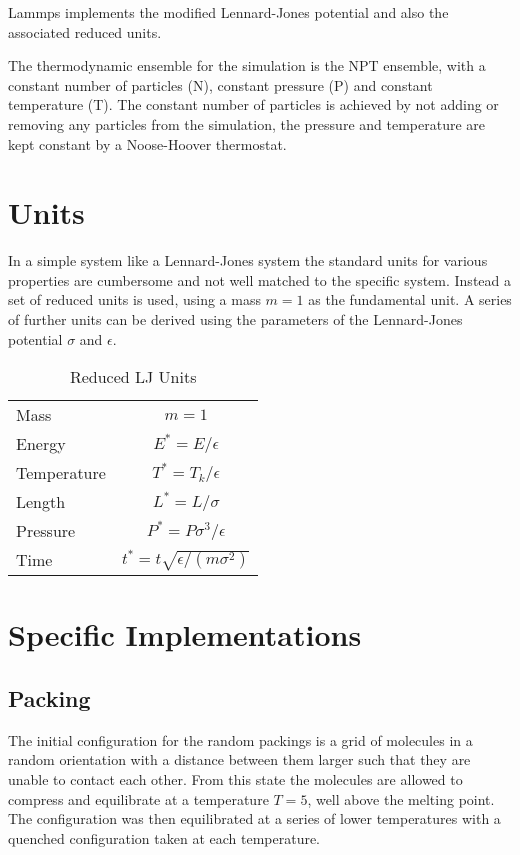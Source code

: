 Lammps implements the modified Lennard-Jones potential and also the associated reduced units.

The thermodynamic ensemble for the simulation is the NPT ensemble, with a constant number of particles (N), constant pressure (P) and constant temperature (T). The constant number of particles is achieved by not adding or removing any particles from the simulation, the pressure and temperature are kept constant by a Noose-Hoover thermostat\tocheck.

\section{Units}

In a simple system like a Lennard-Jones system the standard units for various properties are cumbersome and not well matched to the specific system. Instead a set of reduced units is used, using a mass $m = 1$ as the fundamental unit. A series of further units can be derived using the parameters of the Lennard-Jones potential $\sigma$ and $\epsilon$. 

\begin{table}
    \begin{tabular}{ l c }
        Mass & $ m = 1$ \\
        Energy & $E^* = E/\epsilon$ \\
        Temperature & $T^* = T_k/\epsilon$ \\
        Length & $L^* = L/\sigma$ \\
        Pressure & $P^* = P\sigma^3/\epsilon$ \\
        Time & $t^* = t\sqrt{\epsilon/(m\sigma^2)}$
    \end{tabular}
    \caption{Reduced LJ Units}
    \label{tab:reduced units}
\end{table}

\section{Specific Implementations}

\subsection{Packing}

The initial configuration for the random packings is a grid of molecules in a random orientation with a distance between them larger such that they are unable to contact each other. From this state the molecules are allowed to compress and equilibrate at a temperature $T=5$, well above the melting point. The configuration was then equilibrated at a series of lower temperatures with a quenched configuration taken at each temperature.

